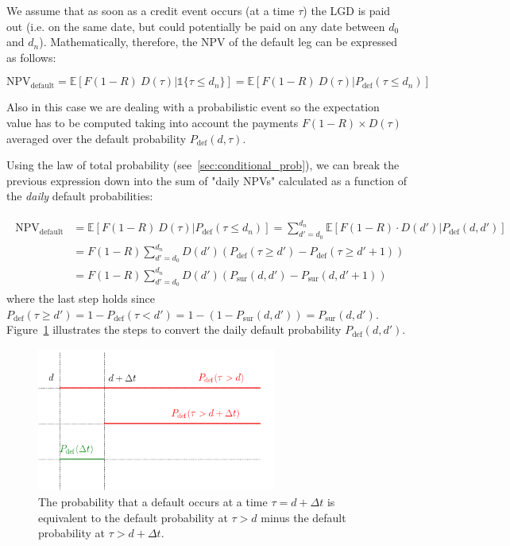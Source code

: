 We assume that as soon as a credit event occurs (at a time $\tau$) the LGD is paid out (i.e. on the same date, but could potentially be paid on any date between $d_0$ and $d_n$). Mathematically, therefore, the NPV of the default leg can be expressed as follows:

\begin{equation}
\mathrm{NPV_{default}} =\mathbb{E}[F(1-R)~D(\tau)|\mathbb{1} \{\tau \leq d_n\} ] = \mathbb{E}[F(1-R)~D(\tau)|P_{\textrm{def}}(\tau \leq d_n) ]
\end{equation}

Also in this case we are dealing with a probabilistic event so the expectation value has to be computed taking into account the payments $F(1-R)\times D(\tau)$ averaged over the default probability $P_{\textrm{def}}(d, \tau)$. 

Using the law of total probability (see~\ref{sec:conditional_prob}), we can break the previous expression down into the sum of "daily NPVs" calculated as a function of the \emph{daily} default probabilities:

\begin{align}
\begin{split}
\mathrm{NPV_{default}} &= \mathbb{E}[F(1-R)~D(\tau)|P_{\textrm{def}}(\tau \leq d_n) ] = \sum_{d'=d_0}^{d_n} \mathbb{E}[F(1-R) \cdot D(d')|P_{\textrm{def}}(d, d')] \\
&= F(1-R) \sum_{d'=d_0}^{d_n} D(d') \left(P_{\textrm{def}}(\tau \geq d') - P_{\textrm{def}}( \tau \geq d'+1) \right) \\
&= F(1-R) \sum_{d'=d_0}^{d_n} D(d') \left( P_{\textrm{sur}}(d, d') - P_{\textrm{sur}}(d, d'+1) \right)
\end{split}
\end{align}
where the last step holds since $P_{\textrm{def}}(\tau\geq d') = 1 - P_{\textrm{def}}(\tau < d') = 1 - (1-P_{\textrm{sur}}(d, d')) = P_{\textrm{sur}}(d, d')$. 
Figure~\ref{fig:default_p} illustrates the steps to convert the daily default probability $P_{\textrm{def}}(d, d')$.

\begin{figure}[htb]
\centering
\includegraphics[width=0.7\textwidth]{figures/timeline}
\caption{The probability that a default occurs at a time $\tau = d+\Delta t$ is equivalent to the default probability at $\tau > d$ minus the default probability at $\tau>d+\Delta t$.}
\label{fig:default_p}
\end{figure}

